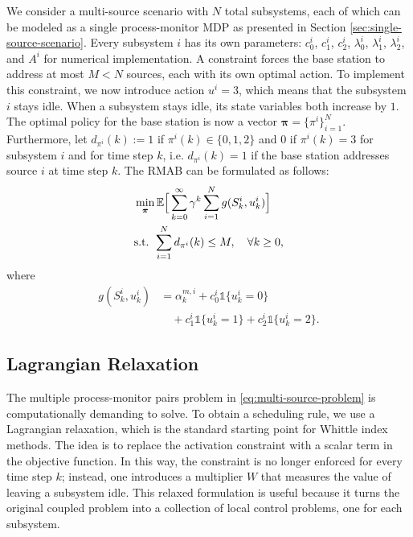 \documentclass[letterpaper,journal]{IEEEtran}
\begin{document}
We consider a multi-source scenario with $N$ total subsystems, each of which can be modeled as a single process-monitor MDP as presented in Section \ref{sec:single-source-scenario}. Every subsystem $i$ has its own parameters: $c^i_0$, $c^i_1$, $c^i_2$, $\lambda^i_0$, $\lambda^i_1$, $\lambda^i_2$, and $A^i$ for numerical implementation. A constraint forces the base station to address at most $M<N$ sources, each with its own optimal action. To implement this constraint, we now introduce action $u^i=3$, which means that the subsystem $i$ stays idle. When a subsystem stays idle, its state variables both increase by $1$. The optimal policy for the base station is now a vector $\bm{\pi}=\{\pi^i\}_{i=1}^N$. Furthermore, let $d_{\pi^i}(k) := 1$ if $\pi^i(k)\in\{0,1,2\}$ and $0$ if $\pi^i(k)=3$ for subsystem $i$ and for time step $k$, i.e. $d_{\pi^i}(k) = 1$ if the base station addresses source $i$ at time step $k$. The RMAB can be formulated as follows:
\begin{equation}\label{eq:multi-source-problem}
\begin{aligned}
&\min_{\boldsymbol{\pi}}\mathbb{E}\Bigr[\sum_{k=0}^{\infty}\gamma^k\sum_{i=1}^Ng(S^i_k,u^i_k)\Bigl]\\&
\text{s.t. } \sum_{i=1}^Nd_{\pi^i}(k)\leq M,\quad\forall k \geq 0,
\end{aligned}
\end{equation}
where
\[
\begin{aligned}
g(S^i_k,u^i_k)&=\alpha^{m,i}_k+c^i_0\mathds{1}\{u^i_k=0\}\\
&\quad+c^i_1\mathds{1}\{u^i_k=1\}+c^i_2\mathds{1}\{u^i_k=2\}.
\end{aligned}
\]
	
	
\subsection{Lagrangian Relaxation}
The multiple process-monitor pairs problem in \eqref{eq:multi-source-problem} is computationally demanding to solve. To obtain a scheduling rule, we use a Lagrangian relaxation, which is the standard starting point for Whittle index methods. The idea is to replace the activation constraint with a scalar term in the objective function. In this way, the constraint is no longer enforced for every time step $k$; instead, one introduces a multiplier $W$ that measures the value of leaving a subsystem idle. This relaxed formulation is useful because it turns the original coupled problem into a collection of local control problems, one for each subsystem.
\end{document}
